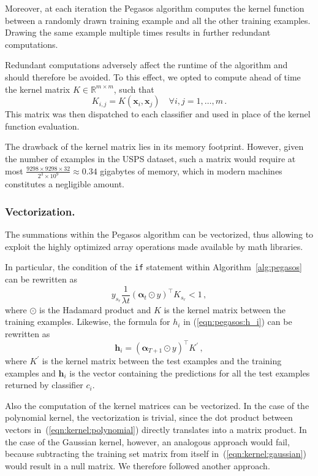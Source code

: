 \documentclass[runningheads]{llncs}
\begin{document}
Moreover, at each iteration the Pegasos algorithm computes the kernel function between a randomly drawn training example and all the other training examples. Drawing the same example multiple times results in further redundant computations.

Redundant computations adversely affect the runtime of the algorithm and should therefore be avoided. To this effect, we opted to compute ahead of time the kernel matrix $K \in \mathbb{R}^{m \times m}$, such that
\[
  K_{i,j} = K(\bm{x}_i, \bm{x}_j) \quad \forall i,j=1,\dots,m \, .
\]
This matrix was then dispatched to each classifier and used in place of the kernel function evaluation.

The drawback of the kernel matrix lies in its memory footprint. However, given the number of examples in the USPS dataset, such a matrix would require at most $\frac{9298 \times 9298 \times 32}{2^3 \times 10^9} \approx 0.34$ gigabytes of memory, which in modern machines constitutes a negligible amount.  

\subsubsection{Vectorization.} The summations within the Pegasos algorithm can be vectorized, thus allowing to exploit the highly optimized array operations made available by math libraries.

In particular, the condition of the \texttt{if} statement within Algorithm~\ref{alg:pegasos} can be rewritten as
\[
  y_{s_r}\frac{1}{\lambda t} (\bm{\alpha}_t \odot y)^\top K_{s_r} < 1 \, ,
\]
where $\odot$ is the Hadamard product and $K$ is the kernel matrix between the training examples. Likewise, the formula for $h_i$ in (\ref{eqn:pegasos:h_i}) can be rewritten as
\[
  \bm{h}_i = (\bm{\alpha}_{T+1} \odot y)^\top K^\prime \, ,
\]
where $K^\prime$ is the kernel matrix between the test examples and the training examples and $\bm{h}_i$ is the vector containing the predictions for all the test examples returned by classifier $c_i$.

Also the computation of the kernel matrices can be vectorized. In the case of the polynomial kernel, the vectorization is trivial, since the dot product between vectors in~(\ref{eqn:kernel:polynomial}) directly translates into a matrix product. In the case of the Gaussian kernel, however, an analogous approach would fail, because subtracting the training set matrix from itself in~(\ref{eqn:kernel:gaussian}) would result in a null matrix. We therefore followed another approach.
\end{document}
